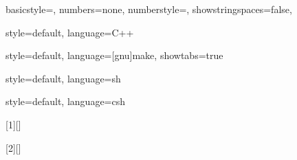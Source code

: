 

\renewcommand{\chapterautorefname}{Chapter}
\renewcommand{\sectionautorefname}{Section}
\renewcommand{\subsectionautorefname}{Subsection}

\newcommand{\Code}[1]{\texttt{#1}}
\newcommand{\Symbol}[1]{\textsl{#1}}
\newcommand{\Makexp}[1]{\texttt{\$(#1)}}
\newcommand{\JiveWebsite}{\url{www.dynaflow.com/software/jive-sdk}}




{
  basicstyle=\ttfamily, numbers=none, numberstyle=\tiny,%
  showstringspaces=false,
}

{
  style=default, language=C++
}

{
  style=default, language=[gnu]make, showtabs=true
}

{
  style=default, language=sh
}

{
  style=default, language=csh
}

[1][]
{
  \lstset{style=default, xleftmargin=5mm, gobble=2, #1}
}
{}

[2][]
{
  \lstset{style=#2, xleftmargin=5mm, gobble=2, #1}
}
{}

\newcommand{\IncludeSource}[3][]
{
  
}




\newlength{\DescrLength}

\newcommand{\DescrFormat}[1]{#1}

\newcommand{\DescrLabel}[1]
{%
  \settowidth{\DescrLength}{\DescrFormat{#1}}%
  \ifthenelse{\lengthtest{\DescrLength > \labelwidth}}%
  {%
    \parbox[b]{\labelwidth}%
    {%
      \makebox[0pt][l]{\DescrFormat{#1}}\\\mbox{}%
    }%
  }{%
    {\DescrFormat{#1}}%
  }%
  \hfil\relax
  \refstepcounter{DescrCounter}
}


